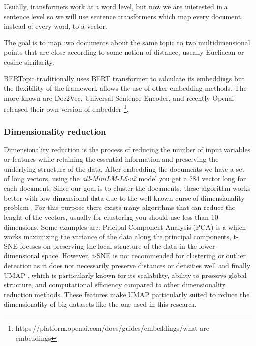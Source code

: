 Usually, transformers work at a word level, but now we are interested in a sentence level so we will use sentence transformers which map every document, instead of every word, to a vector.

The goal is to map two documents about the same topic to two multidimensional points that are close according to some notion of distance, usually Euclidean or cosine similarity.

BERTopic traditionally uses BERT transformer to calculate its embeddings but the flexibility of the framework allows the use of other embedding methods. The more known are Doc2Vec, Universal Sentence Encoder, and recently Openai released their own version of embedder \footnote{https://platform.openai.com/docs/guides/embeddings/what-are-embeddings}.

\subsubsection{Dimensionality reduction}
Dimensionality reduction is the process of reducing the number of input variables or features while retaining the essential information and preserving the underlying structure of the data.
After embedding the documents we have a set of long vectors, using the \textit{all-MiniLM-L6-v2} model you get a 384 vector long for each document.
Since our goal is to cluster the documents, these algorithm works better with low dimensional data due to the well-known curse of dimensionality problem \cite{steinbach_dimensionality_2004}. 
For this purpose there exists many algorithms that can reduce the lenght of the vectors, usually for clustering you should use less than 10 dimensions.
Some examples are: Pricipal Component Analysis \cite{mackiewicz_principal_1993}(PCA) is a which works maximizing the variance of the data along the principal components, t-SNE \cite{JMLR:v9:vandermaaten08a}focuses on preserving the local structure of the data in the lower-dimensional space. However, t-SNE is not recommended for clustering or outlier detection as it does not necessarily preserve distances or densities well and finally UMAP \cite{McInnes2018}, which is particularly known for its scalability, ability to preserve global structure, and computational efficiency compared to other dimensionality reduction methods. These features make UMAP particularly suited to reduce the dimensionality of big datasets like the one used in this research.

